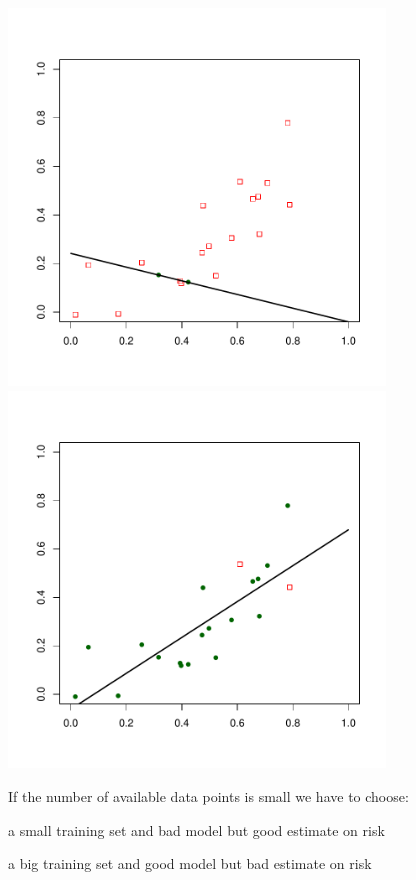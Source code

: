 \documentclass[landscape,footrule]{foils}
\begin{document}
\begin{center}
\includegraphics[width=10cm]{sample-split-1}\hspace*{1cm}
\includegraphics[width=10cm]{sample-split-2}
\end{center}
\vspace{-1cm}

If the number of available data points is small we have to choose:
\begin{triangles}
\item a small training set and bad model but good estimate on risk
\item a big training set and good model but bad estimate on risk
\end{triangles}
\end{document}
